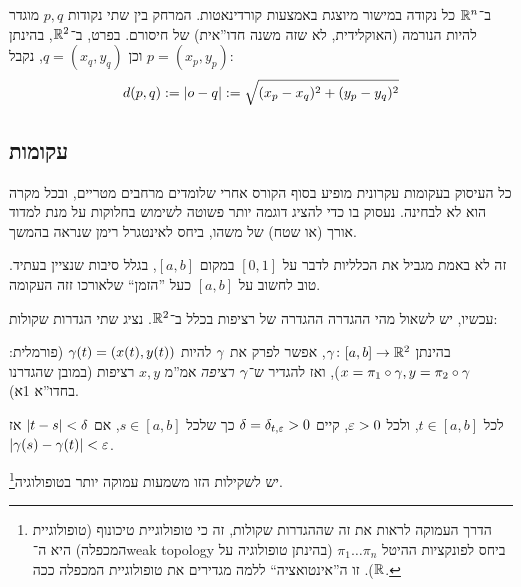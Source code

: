 \documentclass[]{../../../../tex/classes/styledArticle}
\begin{document}
	ב־$\mathbb{R}^{n}$ כל נקודה במישור מיוצגת באמצעות קורדינאטות. המרחק בין שתי נקודות $p, q$ מוגדר להיות הנורמה (האוקלידית, לא שזה משנה חדו''אית) של חיסורם. בפרט, ב־$\mathbb{R}^{2}$, בהינתן $p = (x_p, y_p)$ וכן $q = (x_q, y_q)$, נקבל: 
	\[ d(p, q) := \left \lvert o - q \right \rvert := \sqrt{(x_p - x_q)^{2} + (y_p - y_q)^{2}} \]
	
	\exe{\[ \sof{p - q} = \sof{p - R} + \sof{R - q} \iff R \in [p, q] \]}
	
	\subsection{עקומות}
	כל העיסוק בעקומות עקרונית מופיע בסוף הקורס אחרי שלומדים מרחבים מטריים, ובכל מקרה הוא לא לבחינה. נעסוק בו כדי להציג דוגמה יותר פשוטה לשימוש בחלוקות על מנת למדוד אורך (או שטח) של משהו, ביחס לאינטגרל רימן שנראה בהמשך. 
		
	זה לא באמת מגביל את הכלליות לדבר על $[0, 1]$ במקום $[a, b]$, בגלל סיבות שנציין בעתיד. טוב לחשוב על $[a, b]$ כעל ''הזמן`` שלאורכו זזה העקומה. 
	
	עכשיו, יש לשאול מהי ההגדרה ההגדרה של רציפות בכלל ב־$\mathbb{R}^{2}$. נציג שתי הגדרות שקולות: 
	\begin{Definition}
		בהינתן $\gamma \colon [a, b] \to \mathbb{R}^{2}$, 	אפשר לפרק את $\gamma$ להיות $\gamma(t) = (x(t), y(t))$ (פורמלית: $x = \pi_1 \circ \gamma, y = \pi_2 \circ \gamma$), ואז להגדיר ש־$\gamma$ \textit{רציפה} אמ''מ $x, y$ רציפות (במובן שהגדרנו בחדו''א 1א). 
	\end{Definition}
	\begin{Definition}
		לכל $t \in [a, b]$, ולכל $\eg > 0$, קיים $\dg = \dg_{t, \eg} > 0$ כך שלכל $s \in [a, b]$, אם $\left \lvert t - s \right \rvert < \delta$ אז $\sof{\cg(s) - \cg(t)} < \eg$. 
	\end{Definition}
	
	יש לשקילות הזו משמעות עמוקה יותר בטופולוגיה\footnote{הדרך העמוקה לראות את זה שההגדרות שקולות, זה כי טופולוגיית טיכונוף (טופולוגיית המכפלה) היא ה־weak topology ביחס לפונקציות ההיטל $\pi_1 \dots \pi_n$ (בהינתן טופולוגיה על $\mathbb{R}$). זו ה''אינטואציה`` ללמה מגדירים את טופולוגיית המכפלה ככה. }. 
	
\end{document}
